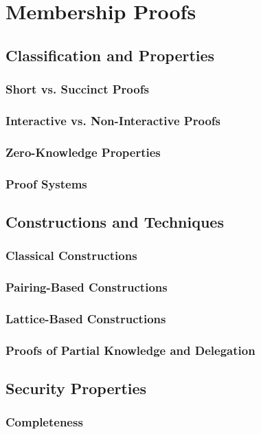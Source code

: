 \documentclass{iacrtrans}
\begin{document}
\section{Membership Proofs}
\subsection{Classification and Properties}
\subsubsection{Short vs. Succinct Proofs}
\subsubsection{Interactive vs. Non-Interactive Proofs}
\subsubsection{Zero-Knowledge Properties}
\subsubsection{Proof Systems}
\subsection{Constructions and Techniques}
\subsubsection{Classical Constructions}
\subsubsection{Pairing-Based Constructions}
\subsubsection{Lattice-Based Constructions}

\subsubsection{Proofs of Partial Knowledge and Delegation}
\subsection{Security Properties}
\subsubsection{Completeness}
\end{document}
